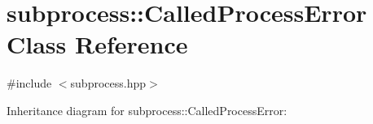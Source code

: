 \hypertarget{classsubprocess_1_1CalledProcessError}{}\section{subprocess\+:\+:Called\+Process\+Error Class Reference}
\label{classsubprocess_1_1CalledProcessError}


{\ttfamily \#include $<$subprocess.\+hpp$>$}



Inheritance diagram for subprocess\+:\+:Called\+Process\+Error\+:
